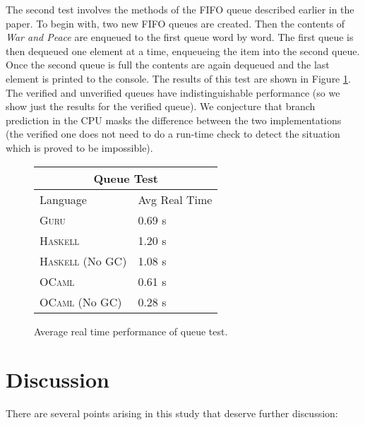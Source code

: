 \documentclass[9pt,natbib]{sigplanconf}
\begin{document}
The second test involves the methods of the FIFO queue described
earlier in the paper.  To begin with, two new FIFO queues are created.
Then the contents of \textit{War and Peace} are enqueued to the first
queue word by word.  The first queue is then dequeued one element at a
time, enqueueing the item into the second queue.  Once the second
queue is full the contents are again dequeued and the last element is
printed to the console.  The results of this test are shown in Figure
\ref{queuestats}.  The verified and unverified queues have
indistinguishable performance (so we show just the results for the
verified queue).  We conjecture that branch prediction in the CPU
masks the difference between the two implementations (the verified one
does not need to do a run-time check to detect the situation which is
proved to be impossible).

\begin{figure}
\begin{center}
\begin{tabular}{| l | l |}
\hline
\multicolumn{2}{|c|}{Queue Test} \\
\hline
Language & Avg Real Time \\
\hline
\textsc{Guru} & 0.69 s \\
\textsc{Haskell} & 1.20 s \\
\textsc{Haskell} (No GC) & 1.08 s \\
\textsc{OCaml} & 0.61 s \\
\textsc{OCaml} (No GC) & 0.28 s \\
\hline
\end{tabular}
\end{center}
\caption{Average real time performance of queue test.}
\label{queuestats}
\end{figure}

\section{Discussion}
\label{sec:future}

There are several points arising in this study that deserve further discussion:

\ 
\end{document}
